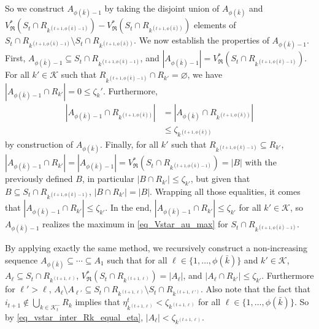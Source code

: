 \documentclass[
  11pt,
  a4paper,
]{article}
\theoremstyle{plain}
\theoremstyle{plain}
\theoremstyle{plain}
\theoremstyle{definition}
\theoremstyle{definition}
\theoremstyle{remark}
\begin{document}
So we construct \(A_{\phi(\bar k)-1}\) by taking the disjoint union of
\(A_{\phi(\bar k)}\) and
\(V^*_{\mathfrak{R}}(S_t \cap R_{k^{(t+1,\phi(\bar k)-1)}}) - V^*_{\mathfrak{R}}(S_t \cap R_{k^{(t+1,\phi(\bar k))}})\)
elements of
\(S_t\cap R_{k^{(t+1,\phi(\bar k)-1)}} \setminus S_t\cap R_{k^{(t+1,\phi(\bar k))}}\).
We now establish the properties of \(A_{\phi(\bar k)-1}\). First,
\(A_{\phi(\bar k)-1}\subseteq S_t \cap R_{k^{(t+1,\phi(\bar k)-1)}}\),
and
\(|A_{\phi(\bar k)-1}|=V^*_{\mathfrak{R}}(S_t \cap R_{k^{(t+1,\phi(\bar k)-1)}})\).
For all \(k'\in\mathcal{K}\) such that
\(R_{k^{(t+1,\phi(\bar k)-1)}} \cap R_{k'}=\varnothing\), we have
\(|A_{\phi(\bar k)-1}\cap R_{k'}|=0\leq \zeta_k'\). Furthermore,
\begin{align*}
|A_{\phi(\bar k)-1}\cap R_{   k^{(t+1,\phi(\bar k))}   }|&=|A_{\phi(\bar k)}\cap R_{   k^{(t+1,\phi(\bar k))}   }|\\
&\leq \zeta_{ k^{(t+1,\phi(\bar k))} }
\end{align*} by construction of \(A_{\phi(\bar k)}\). Finally, for all
\(k'\) such that \(R_{k^{(t+1,\phi(\bar k)-1)}}\subseteq R_{k'}\),
\(|A_{\phi(\bar k)-1}\cap R_{k'}|=|A_{\phi(\bar k)-1}|=V^*_{\mathfrak{R}}(S_t \cap R_{k^{(t+1,\phi(\bar k)-1)}})=|B|\)
with the previously defined \(B\), in particular
\(|B\cap R_{k'}|\leq \zeta_{k'}\), but given that
\(B\subseteq S_t \cap R_{k^{(t+1,\phi(\bar k)-1)}}\),
\(|B\cap R_{k'}|=|B|\). Wrapping all those equalities, it comes that
\(|A_{\phi(\bar k)-1}\cap R_{k'}|\leq \zeta_{k'}\). In the end,
\(|A_{\phi(\bar k)-1}\cap R_{k'}|\leq \zeta_{k'}\) for all
\(k'\in\mathcal{K}\), so \(A_{\phi(\bar k)-1}\) realizes the maximum in
\eqref{eq_Vstar_au_max} for \(S_t \cap R_{k^{(t+1,\phi(\bar k)-1)}}\).

By applying exactly the same method, we recursively construct a
non-increasing sequence \(A_{\phi(\bar k)}\subseteq\dotsb\subseteq A_1\)
such that for all \(\ell\in\{1,\dotsc, \phi(\bar k)\}\) and
\(k'\in\mathcal{K}\), \(A_\ell\subseteq S_t\cap R_{k^{(t+1,\ell)}}\),
\(V^*_{\mathfrak{R}}(S_t\cap R_{k^{(t+1,\ell)}})=|A_\ell|\), and
\(|A_\ell\cap R_{k'}|\leq \zeta_{k'}\). Furthermore for \(\ell'>\ell\),
\(A_{\ell}\setminus A_{\ell'}\subseteq S_t\cap R_{k^{(t+1,\ell)}}\setminus S_t\cap R_{k^{(t+1,\ell')}}\).
Also note that the fact that
\(i_{t+1}\not\in\bigcup_{k\in\mathcal{K}^-_{t}}R_k\) implies that
\(\eta^t_{k^{(t+1,\ell)}}<\zeta_{k^{(t+1,\ell)}}\) for all
\(\ell\in\{1,\dotsc, \phi(\bar k)\}\). So by
\eqref{eq_vstar_inter_Rk_equal_eta},
\(|A_\ell|<\zeta_{k^{(t+1,\ell)}}\).
\end{document}
